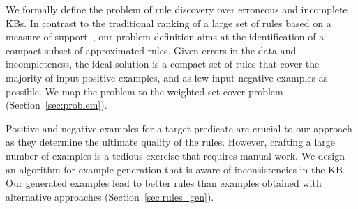 We formally define the problem of rule discovery over erroneous and incomplete KBs. 
In contrast to the traditional ranking of a large set of rules based on a measure of support~\cite{dehaspe1999discovery,galarraga2015fast,schoenmackers2010learning}, our problem definition aims at the identification of a compact subset of approximated rules. %
Given errors in the data and incompleteness, the ideal solution is a compact set of rules that cover the majority of input positive examples, and as few input negative examples as possible. We map the problem to the %
weighted set cover problem (Section~\ref{sec:problem}).




Positive and negative examples for a target predicate are crucial to our approach as they determine the ultimate quality of the rules. However, crafting a large number of examples is a tedious exercise that requires manual work. 
We design an algorithm for example generation that is aware of inconsistencies in the KB. Our generated examples lead to better rules than examples obtained with alternative approaches (Section~\ref{sec:rules_gen}). %


